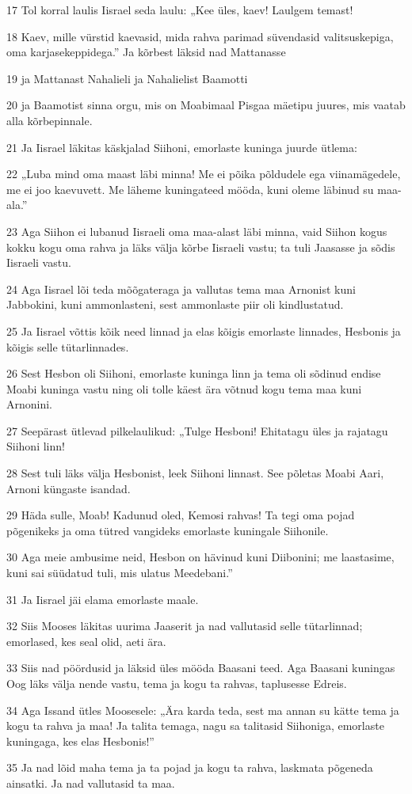 \par 17 Tol korral laulis Iisrael seda laulu: „Kee üles, kaev! Laulgem temast!
\par 18 Kaev, mille vürstid kaevasid, mida rahva parimad süvendasid valitsuskepiga, oma karjasekeppidega.” Ja kõrbest läksid nad Mattanasse
\par 19 ja Mattanast Nahalieli ja Nahalielist Baamotti
\par 20 ja Baamotist sinna orgu, mis on Moabimaal Pisgaa mäetipu juures, mis vaatab alla kõrbepinnale.
\par 21 Ja Iisrael läkitas käskjalad Siihoni, emorlaste kuninga juurde ütlema:
\par 22 „Luba mind oma maast läbi minna! Me ei põika põldudele ega viinamägedele, me ei joo kaevuvett. Me läheme kuningateed mööda, kuni oleme läbinud su maa-ala.”
\par 23 Aga Siihon ei lubanud Iisraeli oma maa-alast läbi minna, vaid Siihon kogus kokku kogu oma rahva ja läks välja kõrbe Iisraeli vastu; ta tuli Jaasasse ja sõdis Iisraeli vastu.
\par 24 Aga Iisrael lõi teda mõõgateraga ja vallutas tema maa Arnonist kuni Jabbokini, kuni ammonlasteni, sest ammonlaste piir oli kindlustatud.
\par 25 Ja Iisrael võttis kõik need linnad ja elas kõigis emorlaste linnades, Hesbonis ja kõigis selle tütarlinnades.
\par 26 Sest Hesbon oli Siihoni, emorlaste kuninga linn ja tema oli sõdinud endise Moabi kuninga vastu ning oli tolle käest ära võtnud kogu tema maa kuni Arnonini.
\par 27 Seepärast ütlevad pilkelaulikud: „Tulge Hesboni! Ehitatagu üles ja rajatagu Siihoni linn!
\par 28 Sest tuli läks välja Hesbonist, leek Siihoni linnast. See põletas Moabi Aari, Arnoni küngaste isandad.
\par 29 Häda sulle, Moab! Kadunud oled, Kemosi rahvas! Ta tegi oma pojad põgenikeks ja oma tütred vangideks emorlaste kuningale Siihonile.
\par 30 Aga meie ambusime neid, Hesbon on hävinud kuni Diibonini; me laastasime, kuni sai süüdatud tuli, mis ulatus Meedebani.”
\par 31 Ja Iisrael jäi elama emorlaste maale.
\par 32 Siis Mooses läkitas uurima Jaaserit ja nad vallutasid selle tütarlinnad; emorlased, kes seal olid, aeti ära.
\par 33 Siis nad pöördusid ja läksid üles mööda Baasani teed. Aga Baasani kuningas Oog läks välja nende vastu, tema ja kogu ta rahvas, taplusesse Edreis.
\par 34 Aga Issand ütles Moosesele: „Ära karda teda, sest ma annan su kätte tema ja kogu ta rahva ja maa! Ja talita temaga, nagu sa talitasid Siihoniga, emorlaste kuningaga, kes elas Hesbonis!”
\par 35 Ja nad lõid maha tema ja ta pojad ja kogu ta rahva, laskmata põgeneda ainsatki. Ja nad vallutasid ta maa.

